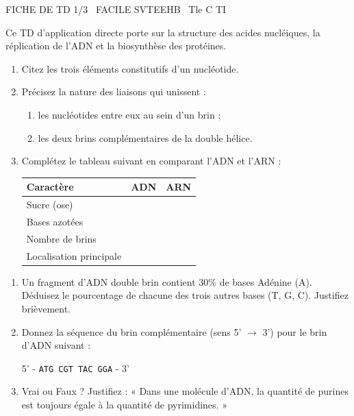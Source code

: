 \documentclass[11pt]{article}
\begin{document}
\begin{tcolorbox}[enhanced,colback=popink,colframe=popink,arc=10pt,boxrule=0pt,left=12pt,right=12pt,top=9pt,bottom=9pt]
{\color{white}\popxbold\small FICHE DE TD 1/3 \textbullet\ FACILE \hfill SVTEEHB \textbullet\ Tle C TI\par}
\end{tcolorbox}
\vspace{4pt}
Ce TD d'application directe porte sur la structure des acides nucléiques, la réplication de l'ADN et la biosynthèse des protéines.

\begin{exercice}
\begin{enumerate}
    \item Citez les trois éléments constitutifs d'un nucléotide.
    \item Précisez la nature des liaisons qui unissent : 
    \begin{enumerate}
        \item les nucléotides entre eux au sein d'un brin ;
        \item les deux brins complémentaires de la double hélice.
    \end{enumerate}
    \item Complétez le tableau suivant en comparant l'ADN et l'ARN :
    \begin{tabular}{|l|c|c|}
        \hline
        \textbf{Caractère} & \textbf{ADN} & \textbf{ARN} \\ \hline
        Sucre (ose) &  &  \\ \hline
        Bases azotées &  &  \\ \hline
        Nombre de brins &  &  \\ \hline
        Localisation principale &  &  \\ \hline
    \end{tabular}
\end{enumerate}
\end{exercice}

\begin{exercice}
\begin{enumerate}
    \item Un fragment d'ADN double brin contient 30\% de bases Adénine (A). Déduisez le pourcentage de chacune des trois autres bases (T, G, C). Justifiez brièvement.
    \item Donnez la séquence du brin complémentaire (sens 5' $\rightarrow$ 3') pour le brin d'ADN suivant : 
    \begin{center}
        5' - \texttt{ATG CGT TAC GGA} - 3'
    \end{center}
    \item Vrai ou Faux ? Justifiez : « Dans une molécule d'ADN, la quantité de purines est toujours égale à la quantité de pyrimidines. »
\end{enumerate}
\end{exercice}
\end{document}
